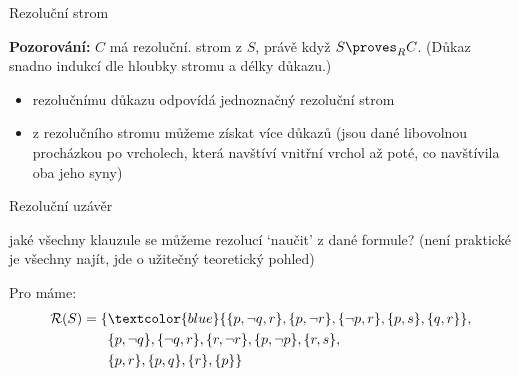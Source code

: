 \documentclass{beamer}
\begin{document}
\begin{frame}{Rezoluční strom}

    \pause

    \medskip

    \textbf{Pozorování:} $C$ má rezoluční. strom z $S$, právě když $S\proves_R C$.
    \pause (Důkaz snadno indukcí dle hloubky stromu a délky důkazu.)
    \pause
    \begin{itemize}
        \item rezolučnímu důkazu odpovídá \alert{jednoznačný} rezoluční strom\pause
        \item z rezolučního stromu můžeme získat více důkazů (jsou dané libovolnou procházkou po vrcholech, která navštíví vnitřní vrchol až poté, co navštívila oba jeho syny)
    \end{itemize}

\end{frame}


\begin{frame}{Rezoluční uzávěr}
    
    jaké všechny klauzule se můžeme rezolucí \alert{`naučit'} z dané formule? (není praktické je všechny najít, jde o užitečný teoretický pohled)\pause
    
    \medskip

    
    \bigskip

    Pro  máme:
    \begin{align*}
        \mathcal R(S)=\{&\textcolor{blue}{\{p,\neg q,r\},\{p,\neg r\},\{\neg p,r\},\{p,s\},\{q,r\}},\\&\{p,\neg q\},\{\neg q,r\},\{r,\neg r\},\{p,\neg p\},\{r,s\},\\&
        \{p,r\},\{p,q\},\{r\},\{p\}\}
    \end{align*}

\end{frame}
\end{document}
